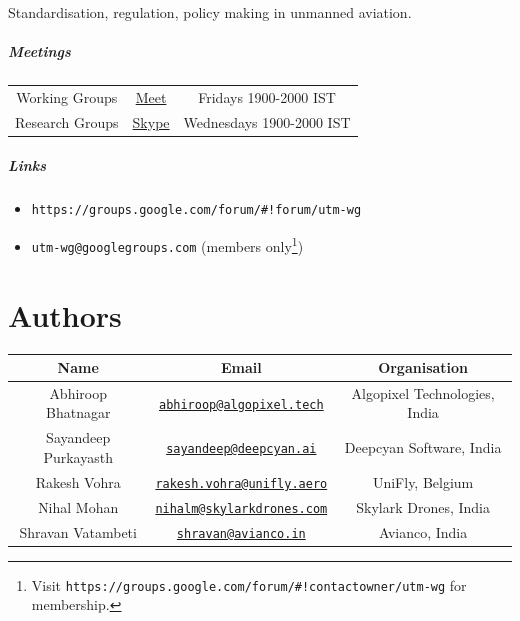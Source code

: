 \documentclass{ua_wgs_base}
\begin{document}
Standardisation, regulation, policy making in unmanned aviation. 

\paragraph*{Meetings}
\begin{center}
\begin{tabular}{|c|c|c|}
\hline 
Working Groups & \href{https://meet.google.com/urz-pekp-rwr}{Meet} & Fridays 1900-2000 IST\tabularnewline
Research Groups & \href{https://join.skype.com/RkNeUB8wNvzx}{Skype} & Wednesdays 1900-2000 IST\tabularnewline
\hline 
\end{tabular}
\par\end{center}

\paragraph*{Links}
\begin{itemize}
\item \texttt{https://groups.google.com/forum/\#!forum/utm-wg}
\item \texttt{utm-wg@googlegroups.com} (members only\footnote{Visit \texttt{https://groups.google.com/forum/\#!contactowner/utm-wg}
for membership.})
\end{itemize}

\chapter*{Authors\label{sec:authors}}

\begin{center}
\begin{tabular}{|c|c|c|}
\hline 
\textbf{Name} & \textbf{Email} & \textbf{Organisation}\tabularnewline
\hline 
Abhiroop Bhatnagar\footnotemark & \texttt{\href{mailto:abhiroop@algopixel.tech}{abhiroop@algopixel.tech}} & Algopixel Technologies, India\tabularnewline
Sayandeep Purkayasth\footnotemark[\value{footnote}] & \texttt{\href{mailto:sayandeep@deepcyan.ai}{sayandeep@deepcyan.ai}} & Deepcyan Software, India\tabularnewline
Rakesh Vohra & \texttt{\href{mailto:rakesh.vohra@unifly.aero}{rakesh.vohra@unifly.aero}} & UniFly, Belgium\tabularnewline
Nihal Mohan & \texttt{\href{mailto:nihalm@skylarkdrones.com}{nihalm@skylarkdrones.com}} & Skylark Drones, India\tabularnewline
Shravan Vatambeti & \texttt{\href{mailto:shravan@avianco.in}{shravan@avianco.in}} & Avianco, India\tabularnewline
\hline 
\end{tabular}
\par\end{center}
\end{document}
